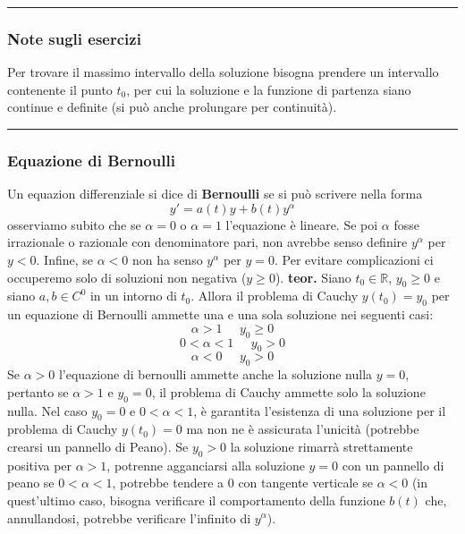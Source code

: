\rule{\textwidth}{0,4pt}\newline
\begin{tcolorbox}
    \subsubsection{Note sugli esercizi}
    Per trovare il massimo intervallo della soluzione bisogna prendere un intervallo contenente il punto $t_0$, per cui la soluzione e la funzione di partenza siano continue e definite (si può anche prolungare per continuità).\newline
\end{tcolorbox}
\rule{\textwidth}{0,4pt}
\subsubsection{Equazione di Bernoulli}
Un equazion differenziale si dice di \textbf{Bernoulli} se si può scrivere nella forma
\[
    y' = a(t)y + b(t) y^\alpha
\]
osserviamo subito che se $\alpha=0$ o $\alpha = 1$ l'equazione è lineare. Se poi $\alpha$ fosse irrazionale o razionale con denominatore pari, non avrebbe senso definire $y^\alpha$ per $y < 0$. Infine, se $\alpha < 0$ non ha senso $y^\alpha$ per $y=0$.\newline
\newline
Per evitare complicazioni ci occuperemo solo di soluzioni non negativa ($y \geq 0$).\newline
\newline
\textbf{teor.} Siano $t_0 \in \mathbb{R}$, $y_0 \geq 0$ e siano $a,b \in C^0$ in un intorno di $t_0$. Allora il problema di Cauchy $y(t_0) = y_0$ per un equazione di Bernoulli ammette una e una sola soluzione nei seguenti casi:
\[
    \alpha> 1 \;\;\;\;\; y_0 \geq 0
\]
\[
    0< \alpha< 1 \;\;\;\;\;y_0 > 0
\]
\[
    \alpha<0 \;\;\;\;\;y_0 > 0
\]
Se $\alpha > 0$ l'equazione di bernoulli ammette anche la soluzione nulla $y=0$, pertanto se  $\alpha > 1$ e $y_0 = 0$, il problema di Cauchy ammette solo la soluzione nulla.\newline
Nel caso $y_0 = 0$ e $0<\alpha < 1$, è garantita l'esistenza di una soluzione per il problema di Cauchy $y(t_0) = 0$ ma non ne è assicurata l'unicità (potrebbe crearsi un pannello di Peano).\newline
Se $y_0 > 0$ la soluzione rimarrà strettamente positiva per $\alpha > 1$, potrenne agganciarsi alla soluzione $y= 0$ con un pannello di peano se $0< \alpha<1$, potrebbe tendere a $0$ con tangente verticale se $\alpha<0$ (in quest'ultimo caso, bisogna verificare il comportamento della funzione $b(t)$ che, annullandosi, potrebbe verificare l'infinito di $y^\alpha$).\newline
